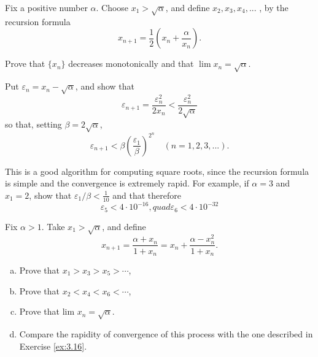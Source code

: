 \begin{myexercise}
    \label{ex:3.16}
    Fix a positive number $\alpha$. 
    Choose $x_1 > \sqrt{\alpha}$, 
    and define $x_2, x_3, x_4, ...$ , 
    by the recursion formula
    \begin{equation*}
        x_{n+1} = \frac{1}{2}\left( x_n + \frac{\alpha}{x_n} \right).
    \end{equation*}
    \begin{asparaenum}[(a)]
        \item Prove that $\{x_n\}$ decreases monotonically and that $\lim x_n = \sqrt{\alpha}$.
        \item  Put $\varepsilon_n = x_n - \sqrt{\alpha}$, and show that
        \begin{equation*}
            \varepsilon_{n+1} 
            = \frac{\varepsilon_n^2}{2 x_n} 
            < \frac{\varepsilon_n^2}{2 \sqrt{\alpha}} 
        \end{equation*}
        so that, setting $\beta = 2 \sqrt{\alpha}$,
        \begin{equation*}
            \varepsilon_{n+1} 
            < \beta \left( \frac{\varepsilon_1}{\beta} \right)^{2^n}
            \quad 
            ( n = 1, 2, 3, ... ) .
        \end{equation*}
        \item  This is a good algorithm for computing square roots, 
        since the recursion formula is simple and the convergence is extremely rapid. 
        For example, if $\alpha = 3$ and $x_1 = 2$, 
        show that $\varepsilon_1/\beta < \frac{1}{10}$ and that therefore
        \begin{equation*}
            \varepsilon_5 < 4 \cdot 10^{-16}, 
            quad 
            \varepsilon_6 < 4 \cdot 10^{-32}
        \end{equation*}
    \end{asparaenum}
\end{myexercise}


\begin{myexercise}
    \label{ex:3.17}
    Fix $\alpha > 1$. Take $x_1 > \sqrt{\alpha}$, and define
    \begin{equation*}
        x_{n+1} = \frac{\alpha + x_n}{1 + x_n} = x_n + \frac{\alpha - x_n^2}{1 + x_n}.
    \end{equation*}
    \begin{enumerate}[(a)]
        \item Prove that $x_1 > x_3 > x_5 >  \cdots$,
        \item Prove that $x_2 < x_4 < x_6 <  \cdots$,
        \item Prove that lim  $x_n = \sqrt{\alpha}$.
        \item Compare the rapidity of convergence of this process with the one described in Exercise \ref{ex:3.16}.
    \end{enumerate}
\end{myexercise}


